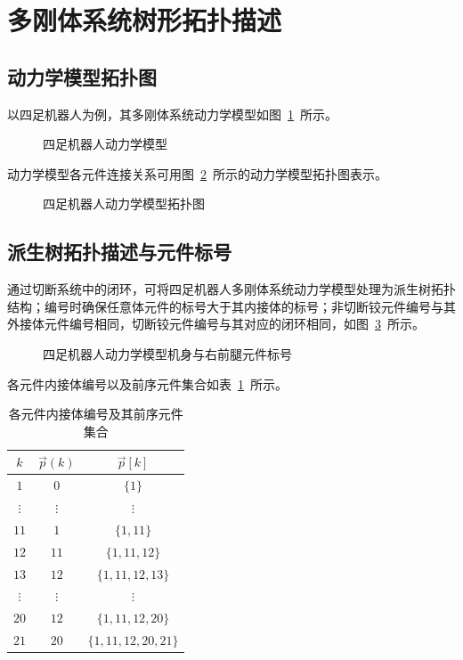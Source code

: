 \section{多刚体系统树形拓扑描述}

\subsection{动力学模型拓扑图}

以四足机器人为例，其多刚体系统动力学模型如图~\ref{fig:10.1}~所示。

\begin{figure}[htbp]
  \centering
  \caption{四足机器人动力学模型}
  \label{fig:10.1}
\end{figure}

动力学模型各元件连接关系可用图~\ref{fig:10.2}~所示的动力学模型拓扑图表示。

\begin{figure}[htbp]
  \centering
  \caption{四足机器人动力学模型拓扑图}
  \label{fig:10.2}
\end{figure}

\subsection{派生树拓扑描述与元件标号}

通过切断系统中的闭环，可将四足机器人多刚体系统动力学模型处理为派生树拓扑结构；编号时确保任意体元件的标号大于其内接体的标号；非切断铰元件编号与其外接体元件编号相同，切断铰元件编号与其对应的闭环相同，如图~\ref{fig:10.3}~所示。

\begin{figure}[htbp]
  \centering
  \caption{四足机器人动力学模型机身与右前腿元件标号}
  \label{fig:10.3}
\end{figure}

各元件内接体编号以及前序元件集合如表~\ref{tab:10.1}~所示。

\begin{table}[htbp]
  \centering
  \caption{各元件内接体编号及其前序元件集合}
  \label{tab:10.1}
  \begin{tabular}{ccc}
    \hline
    $k$ & $\vec{p}(k)$ & $\vec{p}[k]$ \\
    \hline
    $1$  & $0$  & $\{1\}$ \\
    $\vdots$ & $\vdots$ & $\vdots$ \\
    $11$ & $1$  & $\{1,11\}$ \\
    $12$ & $11$ & $\{1,11,12\}$ \\
    $13$ & $12$ & $\{1,11,12,13\}$ \\
    $\vdots$ & $\vdots$ & $\vdots$ \\
    $20$ & $12$ & $\{1,11,12,20\}$ \\
    $21$ & $20$ & $\{1,11,12,20,21\}$ \\
    \hline
  \end{tabular}
\end{table}

